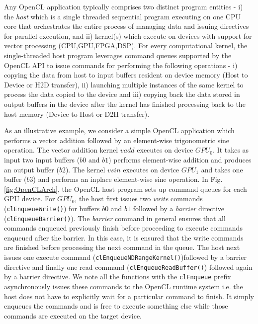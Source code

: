 Any OpenCL application typically comprises two distinct program entities - i) the {\em host} which is a single threaded sequential program executing on one CPU core that orchestrates the entire process of managing data and issuing directives for parallel execution, and ii) kernel(s) which execute on devices with support for vector processing (CPU,GPU,FPGA,DSP).  For every computational kernel, the single-threaded host program leverages command queues supported by the OpenCL API to issue commands for  performing the following operations - i) copying the data from host to input buffers resident on device memory (Host to Device or H2D transfer), ii) launching multiple instances of the same kernel to process the data copied to the device and iii) copying back the data stored in output buffers in the device after the kernel has finished processing back to the host memory (Device to Host or D2H transfer). 
	\par As an illustrative example, we consider a simple OpenCL application which performs a vector addition followed by an element-wise trigonometric sine operation. The vector addition kernel $vadd$ executes on device $GPU_0$. It takes as input two input buffers ($b0$ and $b1$) performs element-wise addition and produces an output buffer ($b2$). The kernel $vsin$ executes on device $GPU_1$ and takes one buffer ($b3$) and performs an inplace element-wise sine operation. In Fig. \ref{fig:OpenCLArch}, the OpenCL host program sets up command queues for each GPU device. For $GPU_0$, the host first issues two {\em write} commands ({\tt clEnqueueWrite()}) for buffers $b0$ and $b1$ followed by a {\em barrier} directive ({\tt clEnqueueBarrier()}). The {\em barrier} command in general ensures that all commands enqueued previously finish before proceeding to execute commands enqueued after the barrier. In this case, it is ensured that the write commands are finished before processing the next command in the queue. The host next issues one execute command ({\tt clEnqueueNDRangeKernel()})followed by a barrier directive and finally one read command ({\tt clEnqueueReadBuffer()}) followed again by a barrier directive. We note all the functions with the {\tt clEnqueue} prefix asynchronously issues these commands to the OpenCL runtime system i.e. the host does not have to explicitly wait for a particular command to finish. It simply enqueues the commands and is free to execute  something else while those commands are executed on the target device. 
